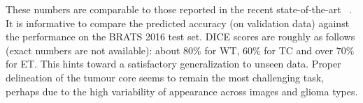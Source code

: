 These numbers are comparable to those reported in the recent state-of-the-art \eg~\cite{kamnitsas2016efficient}. It is informative to compare the predicted accuracy (on validation data) against the performance on the BRATS 2016 test set. DICE scores are roughly as follows (exact numbers are not available): about $80\%$ for WT, $60\%$ for TC and over $70\%$ for ET. This hints toward a satisfactory generalization to unseen data. Proper delineation of the tumour core seems to remain the most challenging task, perhaps due to the high variability of appearance across images and glioma types.
